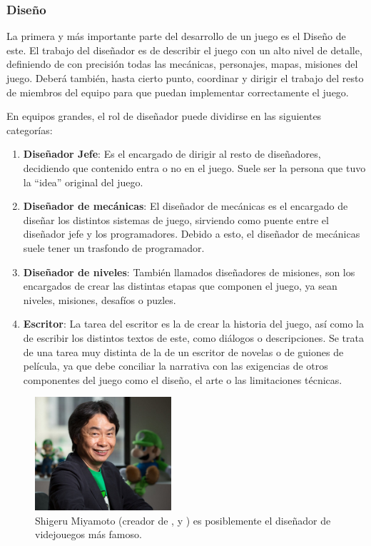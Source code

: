 \subsubsection{Diseño}
La primera y más importante parte del desarrollo de un juego es el Diseño de este. El trabajo del diseñador es de describir el juego con un alto nivel de detalle, definiendo de con precisión todas las mecánicas, personajes, mapas, misiones del juego. Deberá también, hasta cierto punto, coordinar y dirigir el trabajo del resto de miembros del equipo para que puedan implementar correctamente el juego. 

En equipos grandes, el rol de diseñador puede dividirse en las siguientes categorías\cite{development_and_production}:
\begin{enumerate}
\item \textbf{Diseñador Jefe}: Es el encargado de dirigir al resto de diseñadores, decidiendo que contenido entra o no en el juego. Suele ser la persona que tuvo la ``idea'' original del juego.
\item \textbf{Diseñador de mecánicas}: El diseñador de mecánicas es el encargado de diseñar los distintos sistemas de juego, sirviendo como puente entre el diseñador jefe y los programadores. Debido a esto, el diseñador de mecánicas suele tener un trasfondo de programador.
\item \textbf{Diseñador de niveles}: También llamados diseñadores de misiones, son los encargados de crear las distintas etapas que componen el juego, ya sean niveles, misiones, desafíos o puzles.
\item \textbf{Escritor}: La tarea del escritor es la de crear la historia del juego, así como la de escribir los distintos textos de este, como diálogos o descripciones. Se trata de una tarea muy distinta de la de un escritor de novelas o de guiones de película, ya que debe conciliar la narrativa con las exigencias de otros componentes del juego como el diseño, el arte o las limitaciones técnicas.
\end{enumerate}
\begin{figure}[h]
    \centering
    \includegraphics[width=0.45\textwidth]{images/estadodelarte/desarrollo/shigeru-miyamoto}
    \caption{Shigeru Miyamoto (creador de ,  y ) es posiblemente el diseñador de videjouegos más famoso.}
\end{figure}

